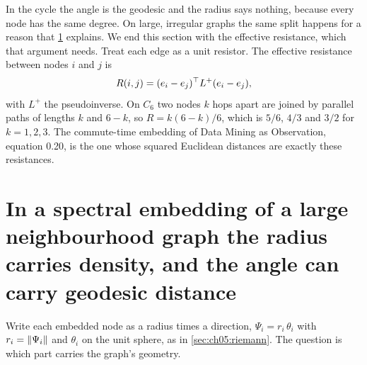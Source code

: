 In the cycle the angle is the geodesic and the radius says nothing, because every node has the same degree. On large, irregular graphs the same split happens for a reason that \cref{sec:ch05:angle} explains. We end this section with the effective resistance, which that argument needs. Treat each edge as a unit resistor. The effective resistance between nodes $i$ and $j$ is
\begin{equation}\label{eq:ch05:resistance}
R(i,j)=(e_i-e_j)^{\top} L^{+}(e_i-e_j),
\end{equation}
with $L^+$ the pseudoinverse. On $C_6$ two nodes $k$ hops apart are joined by parallel paths of lengths $k$ and $6-k$, so $R=k(6-k)/6$, which is $5/6$, $4/3$ and $3/2$ for $k=1,2,3$. The commute-time embedding of Data Mining as Observation, equation 0.20, is the one whose squared Euclidean distances are exactly these resistances.



\section{In a spectral embedding of a large neighbourhood graph the radius carries density, and the angle can carry geodesic distance}\label{sec:ch05:angle}

Write each embedded node as a radius times a direction, $\Psi_i=r_i\,\theta_i$ with $r_i=\lVert \Psi_i\rVert$ and $\theta_i$ on the unit sphere, as in \cref{sec:ch05:riemann}. The question is which part carries the graph's geometry.

